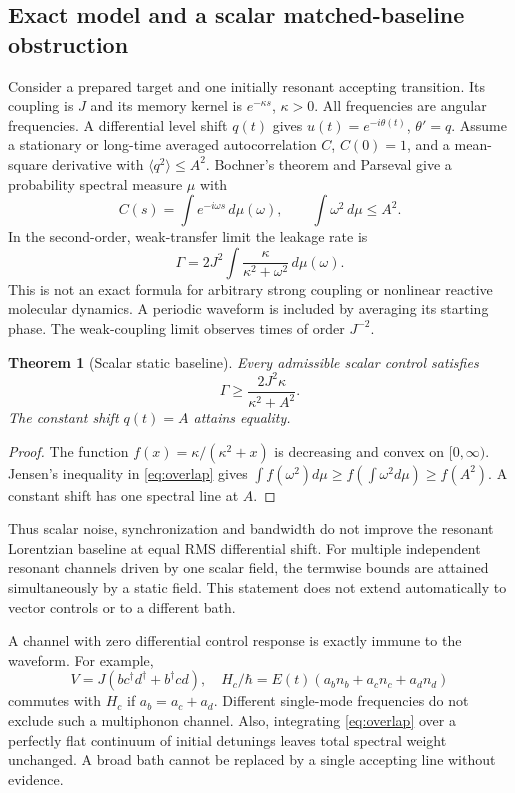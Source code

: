 \documentclass[11pt]{article}
\newtheorem{theorem}{Theorem}
\begin{document}
\subsection{Exact model and a scalar matched-baseline obstruction}

Consider a prepared target and one initially resonant accepting transition.
Its coupling is $J$ and its memory kernel is $e^{-\kappa s}$, $\kappa>0$.
All frequencies are angular frequencies. A differential level shift $q(t)$
gives $u(t)=e^{-i\theta(t)}$, $\theta'=q$. Assume a stationary or long-time
averaged autocorrelation $C$, $C(0)=1$, and a mean-square derivative with
$\langle q^2\rangle\le A^2$.
Bochner's theorem and Parseval give a probability spectral measure $\mu$ with
\[
 C(s)=\int e^{-i\omega s}\,d\mu(\omega),\qquad
 \int\omega^2\,d\mu\le A^2.
\]
In the second-order, weak-transfer limit the leakage rate is
\begin{equation}\label{eq:overlap}
 \Gamma=2J^2\int\frac{\kappa}{\kappa^2+\omega^2}\,d\mu(\omega).
\end{equation}
This is not an exact formula for arbitrary strong coupling or nonlinear
reactive molecular dynamics. A periodic waveform is included by averaging
its starting phase. The weak-coupling limit observes times of order $J^{-2}$.

\begin{theorem}[Scalar static baseline]\label{thm:scalar}
Every admissible scalar control satisfies
\[
 \Gamma\ge\frac{2J^2\kappa}{\kappa^2+A^2}.
\]
The constant shift $q(t)=A$ attains equality.
\end{theorem}
\begin{proof}
The function $f(x)=\kappa/(\kappa^2+x)$ is decreasing and convex on
$[0,\infty)$. Jensen's inequality in \eqref{eq:overlap} gives
$\int f(\omega^2)d\mu\ge f(\int\omega^2d\mu)\ge f(A^2)$.
A constant shift has one spectral line at $A$.
\end{proof}

Thus scalar noise, synchronization and bandwidth do not improve the resonant
Lorentzian baseline at equal RMS differential shift. For multiple independent
resonant channels driven by one scalar field, the termwise bounds are attained
simultaneously by a static field. This statement does not extend automatically
to vector controls or to a different bath.

A channel with zero differential control response is exactly immune to the
waveform. For example,
\[
 V=J(bc^\dagger d^\dagger+b^\dagger cd),\quad
 H_c/\hbar=E(t)(a_b n_b+a_c n_c+a_d n_d)
\]
commutes with $H_c$ if $a_b=a_c+a_d$. Different single-mode frequencies do not
exclude such a multiphonon channel. Also, integrating \eqref{eq:overlap} over
a perfectly flat continuum of initial detunings leaves total spectral weight
unchanged. A broad bath cannot be replaced by a single accepting line without
evidence.
\end{document}

